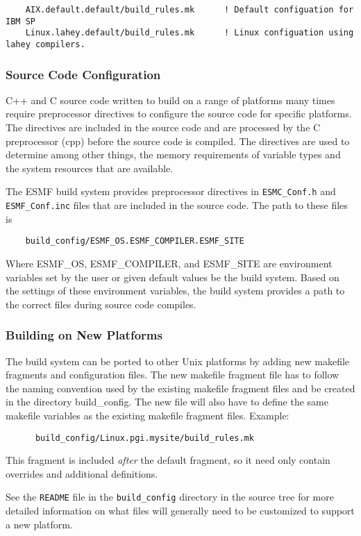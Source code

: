 \begin{verbatim}
    AIX.default.default/build_rules.mk      ! Default configuation for IBM SP
    Linux.lahey.default/build_rules.mk      ! Linux configuation using lahey compilers.
\end{verbatim}

\subsubsection{Source Code Configuration}

C++ and C source code written to build on a range of platforms many
times require preprocessor directives to configure the source code for
specific platforms.  The directives are included in the source code
and are processed by the C preprocessor (cpp) before the source code
is compiled.  The directives are used to determine among other things,
the memory requirements of variable types and the system resources
that are available.

The ESMF build system provides preprocessor directives in 
{\tt ESMC\_Conf.h} and {\tt ESMF\_Conf.inc} files
that are included in the source code.  The path to these files is

\begin{verbatim}
    build_config/ESMF_OS.ESMF_COMPILER.ESMF_SITE
\end{verbatim}

Where ESMF\_OS, ESMF\_COMPILER, and ESMF\_SITE are
environment variables set by the user or given default values be the
build system.  Based on the settings of these environment variables,
the build system provides a path to the correct files during
source code compiles.

\subsubsection{Building on New Platforms}

The build system can be ported to other Unix platforms by adding new
makefile fragments and configuration files.  The new makefile fragment 
file has to follow the naming
convention used by the existing makefile fragment files and be created in the
directory build\_config.  The new file will also have to define
the same makefile variables as the existing makefile fragment files.
Example:

\begin{verbatim}
      build_config/Linux.pgi.mysite/build_rules.mk
\end{verbatim}

This fragment is included {\it after} the default fragment, so it need
only contain overrides and additional definitions.

See the {\tt README} file in the {\tt build\_config} directory in the
source tree for more detailed information on what files will generally
need to be customized to support a new platform.


